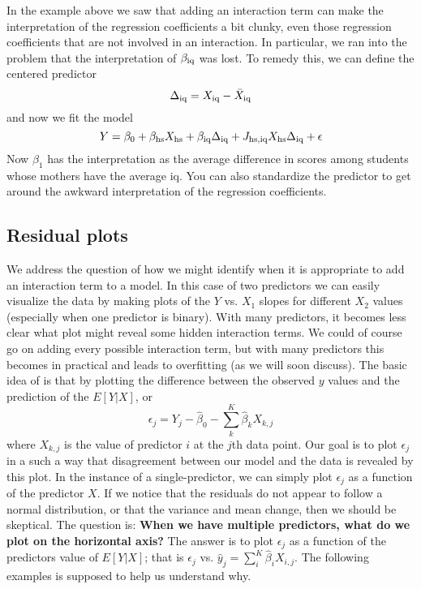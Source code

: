 In the example above we saw that adding an interaction term can make the interpretation  of the regression coefficients a bit clunky, even those regression coefficients that are not involved in an interaction. In particular, we ran into the problem that the interpretation of $\beta_{\rm iq}$ was lost. To remedy this, we can define the centered predictor
\begin{equation*}
\Delta_{\rm iq} = X_{\rm iq} - \bar{X}_{\rm iq} 
\end{equation*}
and now we fit the model 
\begin{equation*}
Y =  \beta_0 +  \beta_{\rm hs} X_{\rm hs} + \beta_{\rm iq}\Delta_{\rm iq} +  J_{\rm hs,iq}X_{\rm hs}\Delta_{\rm iq} + \epsilon 
\end{equation*}
Now $\beta_1$ has the interpretation as the average difference in scores among students whose mothers have the average iq. You can also standardize the predictor to get around the awkward interpretation of the regression coefficients. 






\subsection{Residual plots}


 We address the question of how we might identify when it is appropriate to add an interaction term to a model. In this case of two predictors we can easily visualize the data by making plots of the $Y$ vs. $X_1$ slopes for different $X_2$ values (especially  when one predictor is binary). With many predictors, it becomes less clear what plot might reveal some hidden interaction terms. We could of course go on adding every possible interaction term, but with many predictors this becomes in practical and leads to overfitting (as we will soon discuss). 
 The basic idea of  is that by plotting the difference between the observed $y$ values and the prediction of the $E[Y|X]$, or 
\begin{equation*}
\epsilon_j  = Y_j - \hat{\beta}_0 - \sum_k^{K}\hat{\beta}_kX_{k,j}
\end{equation*}
where $X_{k,j}$ is the value of predictor $i$ at the $j$th data point. 
Our goal is to plot $\epsilon_j$ in a such a way that disagreement between our model and the data is revealed by this plot.  In the instance of a single-predictor, we can simply plot $\epsilon_j$ as a function of the predictor $X$. If we notice that the residuals do not appear to follow a normal distribution, or that the variance and mean change, then we should be skeptical.
 The question is: {\bf When we have multiple predictors, what do we plot on the horizontal axis?}   The answer is to plot $\epsilon_j$ as a function of the predictors value of $E[Y|X]$; that is $\epsilon_j$ vs. $\hat{y}_j = \sum_i^{K} \hat{\beta}_iX_{i,j}$. The following examples is supposed to help us understand why. 




